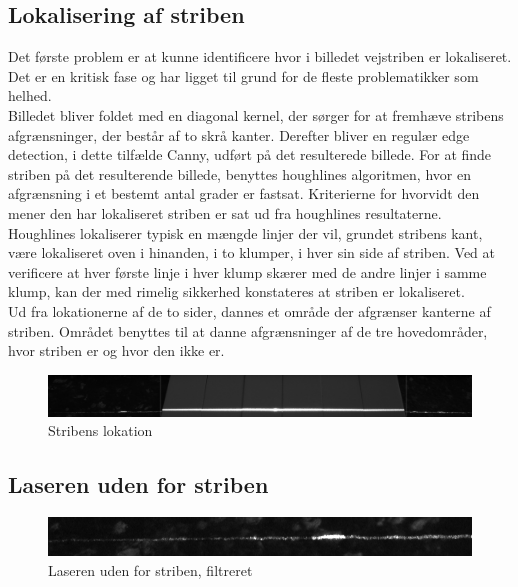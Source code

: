 \subsection{Lokalisering af striben\label{ref::stribefind}}
Det første problem er at kunne identificere hvor i billedet vejstriben er lokaliseret. Det er en kritisk fase og har ligget til grund for de fleste problematikker som helhed.
\\
Billedet bliver foldet med en diagonal kernel, der sørger for at fremhæve stribens afgrænsninger, der består af to skrå kanter.
Derefter bliver en regulær edge detection, i dette tilfælde Canny, udført på det resulterede billede. For at finde striben på det resulterende billede, benyttes houghlines algoritmen, hvor en afgrænsning i et bestemt antal grader er fastsat. Kriterierne for hvorvidt den mener den har lokaliseret striben er sat ud fra houghlines resultaterne. Houghlines lokaliserer typisk en mængde linjer der vil, grundet stribens kant, være lokaliseret oven i hinanden, i to klumper, i hver sin side af striben.
Ved at verificere at hver første linje i hver klump skærer med de andre linjer i samme klump, kan der med rimelig sikkerhed konstateres at striben er lokaliseret.
\\
Ud fra lokationerne af de to sider, dannes et område der afgrænser kanterne af striben. Området benyttes til at danne afgrænsninger af de tre hovedområder, hvor striben er og hvor den ikke er.

\begin{figure}[h]
	\centering
	\includegraphics[width=0.8\linewidth]{Billeder/_1_normal}
	\caption{Stribens lokation}
	\label{fig:1normal}
\end{figure}

\newpage

\subsection{Laseren uden for striben}

\begin{figure}[h]
	\centering
	\includegraphics[width=0.7\linewidth]{Billeder/base_1_filter}
	\caption{Laseren uden for striben, filtreret}
	\label{fig:base_1_filter}
\end{figure}

